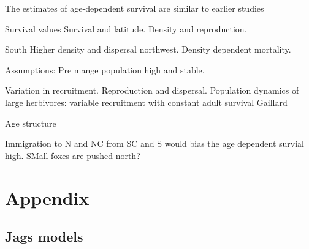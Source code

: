 \documentclass[12pt, a4paper]{article}
\begin{document}
The estimates of age-dependent survival are similar to earlier studies

Survival values
Survival and latitude. Density and reproduction.

South  Higher density and dispersal northwest. Density dependent mortality.


Assumptions: Pre mange population high and stable.

Variation in recruitment. Reproduction and dispersal. Population dynamics of large herbivores: variable recruitment with constant adult survival Gaillard

Age structure \citep{yonedaEffectsHuntingAge1982}

Immigration to N and NC from SC and S would bias the age dependent survial high. SMall foxes are pushed north?

\newpage
\singlespacing
\printbibliography

\newpage
\section*{Appendix}

\subsection*{Jags models}
\end{document}
